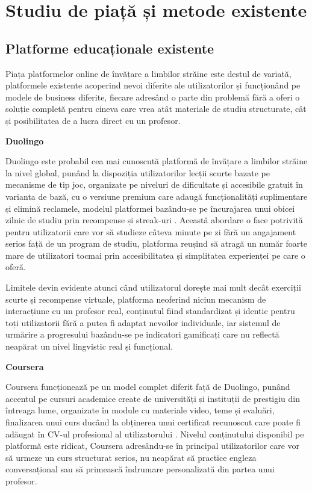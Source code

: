 \chapter{Studiu de piață și metode existente}

\section{Platforme educaționale existente}
Piața platformelor online de învățare a limbilor străine este destul de variată, platformele existente acoperind nevoi diferite ale utilizatorilor și funcționând pe modele de business diferite, fiecare adresând o parte din problemă fără a oferi o soluție completă pentru cineva care vrea atât materiale de studiu structurate, cât și posibilitatea de a lucra direct cu un profesor.

\textbf{Duolingo}

Duolingo este probabil cea mai cunoscută platformă de învățare a limbilor străine la nivel global, punând la dispoziția utilizatorilor lecții scurte bazate pe mecanisme de tip joc, organizate pe niveluri de dificultate și accesibile gratuit în varianta de bază, cu o versiune premium care adaugă funcționalități suplimentare și elimină reclamele, modelul platformei bazându-se pe încurajarea unui obicei zilnic de studiu prin recompense și streak-uri \cite{duolingo}. Această abordare o face potrivită pentru utilizatorii care vor să studieze câteva minute pe zi fără un angajament serios față de un program de studiu, platforma reușind să atragă un număr foarte mare de utilizatori tocmai prin accesibilitatea și simplitatea experienței pe care o oferă.

Limitele devin evidente atunci când utilizatorul dorește mai mult decât exerciții scurte și recompense virtuale, platforma neoferind niciun mecanism de interacțiune cu un profesor real, conținutul fiind standardizat și identic pentru toți utilizatorii fără a putea fi adaptat nevoilor individuale, iar sistemul de urmărire a progresului bazându-se pe indicatori gamificați care nu reflectă neapărat un nivel lingvistic real și funcțional.

\textbf{Coursera}

Coursera funcționează pe un model complet diferit față de Duolingo, punând accentul pe cursuri academice create de universități și instituții de prestigiu din întreaga lume, organizate în module cu materiale video, teme și evaluări, finalizarea unui curs ducând la obținerea unui certificat recunoscut care poate fi adăugat în CV-ul profesional al utilizatorului \cite{coursera}. Nivelul conținutului disponibil pe platformă este ridicat, Coursera adresându-se în principal utilizatorilor care vor să urmeze un curs structurat serios, nu neapărat să practice engleza conversațional sau să primească îndrumare personalizată din partea unui profesor.

